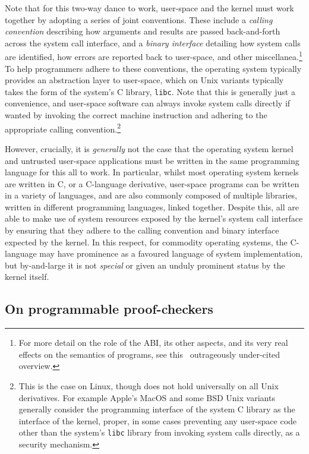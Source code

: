 \documentclass[a4paper, UKenglish, cleveref, autoref, thm-restate, colorlinks]{lipics-v2021}
\begin{document}
Note that for this two-way dance to work, user-space and the kernel must work together by adopting a series of joint conventions.
These include a \emph{calling convention} describing how arguments and results are passed back-and-forth across the system call interface, and a \emph{binary interface} detailing how system calls are identified, how errors are reported back to user-space, and other miscellanea.\footnote{For more detail on the role of the ABI, its other aspects, and its very real effects on the semantics of programs, see this~\cite{DBLP:conf/oopsla/KellMS16} outrageously under-cited overview.}
To help programmers adhere to these conventions, the operating system typically provides an abstraction layer to user-space, which on Unix variants typically takes the form of the system's C library, \texttt{libc}.
Note that this is generally just a convenience, and user-space software can always invoke system calls directly if wanted by invoking the correct machine instruction and adhering to the appropriate calling convention.\footnote{This is the case on Linux, though does not hold universally on all Unix derivatives.  For example Apple's MacOS and some BSD Unix variants generally consider the programming interface of the system C library as the interface of the kernel, proper, in some cases preventing any user-space code other than the system's \texttt{libc} library from invoking system calls directly, as a security mechanism.}

However, crucially, it is \emph{generally} not the case that the operating system kernel and untrusted user-space applications must be written in the same programming language for this all to work.
In particular, whilst most operating system kernels are written in C, or a C-language derivative, user-space programs can be written in a variety of languages, and are also commonly composed of multiple libraries, written in different programming languages, linked together.
Despite this, all are able to make use of system resources exposed by the kernel's system call interface by ensuring that they adhere to the calling convention and binary interface expected by the kernel.
In this respect, for commodity operating systems, the C-language may have prominence as a favoured language of system implementation, but by-and-large it is not \emph{special} or given an unduly prominent status by the kernel itself.

\subsection{On programmable proof-checkers}
\end{document}
